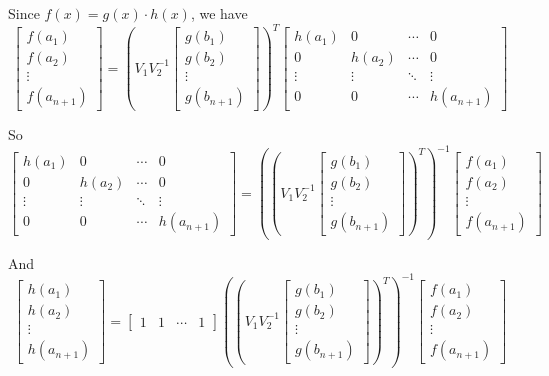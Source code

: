 \documentclass[11pt]{article}
\begin{document}
\begin{enumerate}
			 Since $f(x) = g(x)\cdot h(x)$, we have
			 \[\begin{bmatrix}
			 	f(a_1)\\
			 	f(a_2)\\
			 	\vdots\\
			 	f(a_{n + 1})
			 \end{bmatrix} = \left(V_1V_2^{-1}\begin{bmatrix}
			 	g(b_1)\\
			 	g(b_2)\\
			 	\vdots\\
			 	g(b_{n + 1})
			 \end{bmatrix}\right)^T
			 \begin{bmatrix}
			 	h(a_1) & 0 & \cdots & 0\\
			 	0 & h(a_2) & \cdots & 0\\
			 	\vdots & \vdots & \ddots & \vdots\\
			 	0 & 0 & \cdots & h(a_{n + 1})
			 \end{bmatrix} \]
			 
			 So
			 \[\begin{bmatrix}
			 	h(a_1) & 0 & \cdots & 0\\
			 	0 & h(a_2) & \cdots & 0\\
			 	\vdots & \vdots & \ddots & \vdots\\
			 	0 & 0 & \cdots & h(a_{n + 1})
			 \end{bmatrix} = \left(\left(V_1V_2^{-1}\begin{bmatrix}
			 	g(b_1)\\
			 	g(b_2)\\
			 	\vdots\\
			 	g(b_{n + 1})
			 \end{bmatrix}\right)^T\right)^{-1}\begin{bmatrix}
			 	f(a_1)\\
			 	f(a_2)\\
			 	\vdots\\
			 	f(a_{n + 1})
			 \end{bmatrix}\]
			 
			 And 
			 \[\begin{bmatrix}
			 	h(a_1)\\
			 	h(a_2)\\
			 	\vdots\\
			 	h(a_{n + 1})
			 \end{bmatrix} = 
			 	\begin{bmatrix}
			 		1 & 1 & \cdots & 1
			 	\end{bmatrix}
			 \left(\left(V_1V_2^{-1}\begin{bmatrix}
			 	g(b_1)\\
			 	g(b_2)\\
			 	\vdots\\
			 	g(b_{n + 1})
			 \end{bmatrix}\right)^T\right)^{-1}\begin{bmatrix}
			 	f(a_1)\\
			 	f(a_2)\\
			 	\vdots\\
			 	f(a_{n + 1})
			 \end{bmatrix}
			 \]
			 

\end{enumerate}
\end{document}
